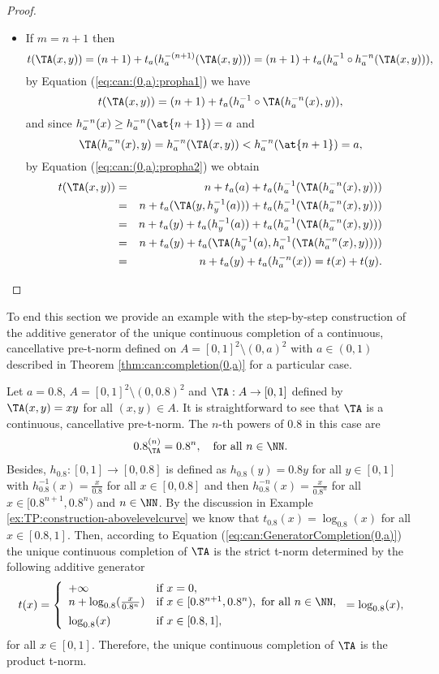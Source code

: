 \begin{proof}
\begin{description}
\begin{itemize}
			\item If $m=n+1$ then
			$$t(\TA(x,y)) = (n+1)+t_a(h_a^{-(n+1)}(\TA(x,y))) = (n+1)+t_a(h_a^{-1} \circ h_a^{-n}(\TA(x,y))),$$
			by Equation (\ref{eq:can:(0,a):propha1})  we have
			$$t(\TA(x,y))=(n+1)+t_a(h_a^{-1} \circ \TA(h_a^{-n}(x),y)),$$
			and since $h_a^{-n}(x) \geq h_a^{-n}(\at{n+1})=a$ and 
			$$\TA(h_a^{-n}(x),y)=h_a^{-n}(\TA(x,y))<h_a^{-n}(\at{n+1})=a,$$
			by Equation (\ref{eq:can:(0,a):propha2}) we obtain 
			\begin{eqnarray*}
				t(\TA(x,y)) & = &n + t_a(a) + t_a(h_a^{-1}(\TA(h_a^{-n}(x),y))) \\
				&=& n + t_a(\TA(y,h_y^{-1}(a))) + t_a(h_a^{-1}(\TA(h_a^{-n}(x),y))) \\
				&=& n + t_a(y) + t_a(h_y^{-1}(a)) + t_a(h_a^{-1}(\TA(h_a^{-n}(x),y))) \\
				&=& n + t_a(y) + t_a(\TA(h_y^{-1}(a),h_a^{-1}(\TA(h_a^{-n}(x),y)))) \\
				&=& n + t_a(y) + t_a(h_a^{-n}(x)) = t(x) + t(y).
			\end{eqnarray*}
		\end{itemize}
	\end{description}
\end{proof}

To end this section we provide an example with the step-by-step construction of the additive generator of the unique continuous completion of a continuous, cancellative pre-t-norm defined on $A=[0,1]^2 \setminus (0,a)^2$ with $a \in (0,1)$ described in Theorem \ref{thm:can:completion(0,a)} for a particular case.

\begin{example}\label{example:can:(0,a)}
	Let $a=0.8$, $A=[0,1]^2 \setminus (0,0.8)^2$ and $\TA: A \to [0,1]$ defined by $\TA(x,y)=xy$ for all $(x,y) \in A$. It is straightforward to see that $\TA$ is a continuous, cancellative pre-t-norm. The $n$-th powers of $0.8$ in this case are
	$$0.8_{\TA}^{(n)}=0.8^n, \quad \text{for all } n \in \NN.$$
	Besides, $h_{0.8}:[0,1] \to [0,0.8]$ is defined as $h_{0.8}(y)=0.8y$ for all $y \in [0,1]$ with $h_{0.8}^{-1}(x)=\frac{x}{0.8}$ for all $x \in [0,0.8]$ and then $h_{0.8}^{-n}(x)=\frac{x}{0.8^n}$ for all $x \in [ 0.8^{n+1}, 0.8^n)$ and $n \in \NN$. By the discussion in Example \ref{ex:TP:construction-abovelevelcurve} we know that $t_{0.8}(x)=\log_{0.8}(x)$ for all $x \in [0.8,1]$. Then, according to Equation (\ref{eq:can:GeneratorCompletion(0,a)}) the unique continuous completion of $\TA$ is the strict t-norm determined by the following additive generator
	$$
		t(x)
		=
		\left\{ \begin{array}{ll}
			+\infty & \text{if } x=0,\\
			n+\log_{0.8}(\frac{x}{0.8^n}) &   \text{if }   x \in [0.8^{n+1},0.8^n), \text{ for all } n \in \NN,\\[5pt]
			\log_{0.8}(x) & \text{if } x \in [0.8,1],
		\end{array} \right.
		= \log_{0.8}(x),
	$$
	for all $x \in [0,1]$. Therefore, the unique continuous completion of $\TA$ is the product t-norm.
\end{example}

